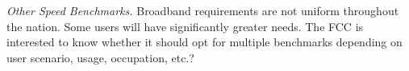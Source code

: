  \emph{Other Speed Benchmarks.} Broadband requirements are not uniform throughout the nation. Some users will have significantly greater needs. The FCC is interested to know whether it should opt for multiple benchmarks depending on user scenario, usage, occupation, etc.? 


